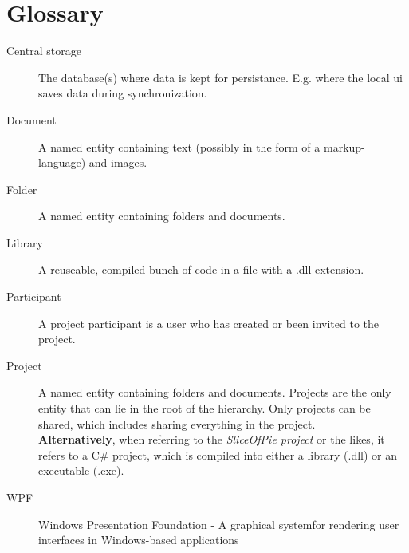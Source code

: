 \section{Glossary}
\label{sec:glossary}

\begin{description}

    \item[Central storage] The database(s) where data is kept for persistance. E.g. where the local ui saves data during synchronization.
    \item[Document] A named entity containing text (possibly in the form of a markup-language) and images.
    \item[Folder] A named entity containing folders and documents.
    \item[Library] A reuseable, compiled bunch of code in a file with a .dll extension.
    \item[Participant] A project participant is a user who has created or been invited to the project.
    \item[Project] A named entity containing folders and documents. Projects are the only entity that
        can lie in the root of the hierarchy. Only projects can be shared, which includes sharing
        everything in the project. \\
        \textbf{Alternatively}, when referring to the \emph{SliceOfPie project} or the likes, it refers to a C\# project,
        which is compiled into either a library (.dll) or an executable (.exe).
    \item[WPF] Windows Presentation Foundation - A graphical systemfor rendering user interfaces in Windows-based applications

\end{description}
